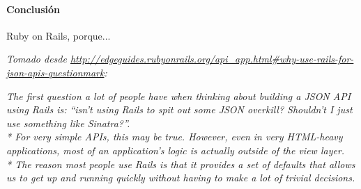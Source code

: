 \paragraph{Conclusión}

Ruby on Rails, porque...

\textit{Tomado desde \url{http://edgeguides.rubyonrails.org/api_app.html\#why-use-rails-for-json-apis-questionmark}:}

\textit{The first question a lot of people have when thinking about building a JSON API using Rails is: ``isn't using Rails to spit out some JSON overkill? Shouldn't I just use something like Sinatra?''.\\* For very simple APIs, this may be true. However, even in very HTML-heavy applications, most of an application's logic is actually outside of the view layer.\\* The reason most people use Rails is that it provides a set of defaults that allows us to get up and running quickly without having to make a lot of trivial decisions.}
